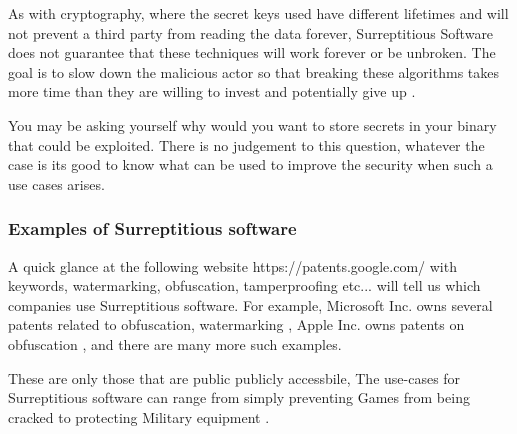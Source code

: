As with cryptography, where the secret keys used have different lifetimes and will not prevent a third party from reading the data forever,
Surreptitious Software does not guarantee that these techniques will work forever or be unbroken.
The goal is to slow down the malicious actor so that breaking these algorithms takes more time than they are willing to invest and potentially give up \cite{serr-soft}.

You may be asking yourself why would you want to store secrets in your binary that could be exploited. There is no
judgement to this question, whatever the case is its good to know what can be used to improve the security when such
a use cases arises.

\subsubsection{Examples of Surreptitious software}

A quick glance at the following website https://patents.google.com/ with keywords, watermarking, obfuscation, tamperproofing etc... will tell us which companies use Surreptitious software.
For example, Microsoft Inc. owns several patents related to obfuscation, watermarking \cite{ms-patent01},
Apple Inc. owns patents on obfuscation \cite{apple-patent01}, and there are many more such examples.

These are only those that are public publicly accessbile, The use-cases for Surreptitious software can range from simply
preventing Games from being cracked to protecting Military equipment \cite{serr-soft}.






